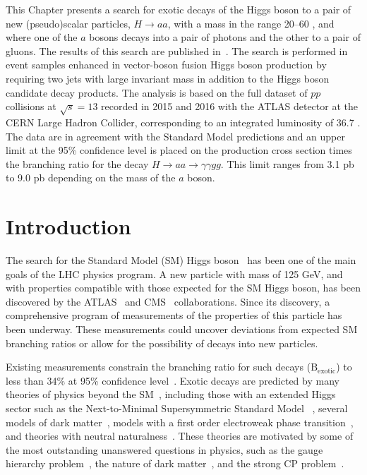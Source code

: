 This Chapter presents a search for exotic decays of the Higgs boson to a pair of new (pseudo)scalar
particles, $H\to aa$, with a mass in the range 20--60 \GeV{}, and where one of the $a$ bosons decays into a pair of photons and the other to a pair of gluons.
The results of this search are published in~\cite{Aaboud:2018gmx}.
The search is performed in event samples enhanced in vector-boson fusion Higgs boson production
by requiring two jets with large invariant mass in addition to the Higgs boson candidate decay products.
The analysis is based on the full dataset of $pp$ collisions at $\sqrt{s}= 13$ \TeV{} recorded in 2015 and 2016 with the ATLAS detector at the CERN Large Hadron Collider,
corresponding to an integrated luminosity of 36.7 \ifb.
The data are in agreement with the Standard Model predictions and an upper limit at the 95\% confidence level is placed on the production cross section times the
branching ratio for the decay $H\to aa\to \gamma\gamma gg$.
This limit ranges from 3.1 pb to 9.0 pb depending on the mass of the $a$ boson.


\section{Introduction}

The search for the Standard Model (SM) Higgs 
boson~\cite{Englert:1964et,Higgs:1964pj,Higgs:1964ia,Guralnik:1964eu}  
has been one of the main goals of the LHC physics program.  
A new particle with mass  of 125 GeV, and with  properties compatible with those expected for the SM Higgs boson, 
has been discovered by the ATLAS~\cite{HIGG-2012-27} and CMS~\cite{CMS-HIG-12-028} collaborations.
Since its discovery, a comprehensive program of measurements of the properties of this particle has been underway.
These measurements could uncover deviations from expected SM branching ratios or 
allow for the possibility of decays into new particles. 

Existing measurements constrain the branching ratio for such decays ($\text{B}_\text{exotic}$) 
to less than 34\% at 95\% confidence level~\cite{Khachatryan:2016vau}.
Exotic decays are predicted by many theories of physics beyond the SM~\cite{Curtin:2013fra},
including those with an extended Higgs sector 
such as the Next-to-Minimal Supersymmetric Standard Model 
~\cite{Dobrescu:2000yn,Ellwanger:2003jt,Dermisek:2005ar,Chang:2008cw,Morrissey:2008gm},
several models of dark matter~\cite{SILVEIRA1985136,Pospelov:2007mp,Draper:2010ew,Ipek:2014gua,Martin:2014sxa},
models with a first order electroweak phase transition~\cite{Profumo:2007wc,Blinov:2015sna},
and theories with neutral naturalness~\cite{Burdman:2006tz,Craig:2015pha,Curtin:2015fna}.
These theories are motivated by some of the most outstanding unanswered questions in physics, such as the gauge hierarchy problem~\cite{Nilles:1982dy}, the nature of dark matter~\cite{Trimble:1987ee}, and the strong CP problem~\cite{Peccei:1977hh}.

